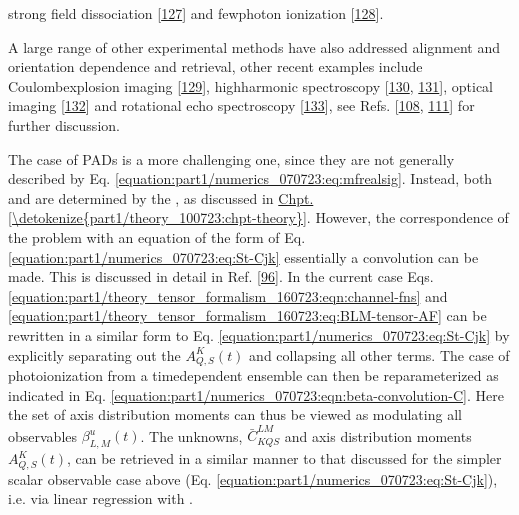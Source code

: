 \documentclass[letterpaper,table,10pt,english]{jupyterBook}
\begin{document}
strong field dissociation {[}\hyperlink{cite.backmatter/bibliography:id996}{127}{]} and few\sphinxhyphen{}photon ionization {[}\hyperlink{cite.backmatter/bibliography:id995}{128}{]}.%
\begin{footnote}[2]\sphinxAtStartFootnote
A large range of other experimental methods have also addressed alignment and orientation dependence and retrieval, other recent examples include Coulomb\sphinxhyphen{}explosion imaging {[}\hyperlink{cite.backmatter/bibliography:id936}{129}{]}, high\sphinxhyphen{}harmonic spectroscopy {[}\hyperlink{cite.backmatter/bibliography:id644}{130}, \hyperlink{cite.backmatter/bibliography:id645}{131}{]}, optical imaging {[}\hyperlink{cite.backmatter/bibliography:id758}{132}{]} and rotational echo spectroscopy {[}\hyperlink{cite.backmatter/bibliography:id950}{133}{]}, see Refs. {[}\hyperlink{cite.backmatter/bibliography:id726}{108}, \hyperlink{cite.backmatter/bibliography:id833}{111}{]} for further discussion.
%
\end{footnote}

\sphinxAtStartPar
The case of PADs is a more challenging one, since they are not generally described by Eq. \eqref{equation:part1/numerics_070723:eq:mfrealsig}. Instead, both {\hyperref[\detokenize{backmatter/glossary:term-AF}]{}} and {\hyperref[\detokenize{backmatter/glossary:term-MF}]{}} are determined by the {\hyperref[\detokenize{backmatter/glossary:term-radial-matrix-elements}]{}}, as discussed in \hyperref[\detokenize{part1/theory_100723:chpt-theory}]{Chpt.\@ \ref{\detokenize{part1/theory_100723:chpt-theory}}}. However, the correspondence of the problem with an equation of the form of Eq. \eqref{equation:part1/numerics_070723:eq:St-Cjk} \sphinxhyphen{} essentially a convolution \sphinxhyphen{} can be made. This is discussed in detail in Ref. {[}\hyperlink{cite.backmatter/bibliography:id934}{96}{]}. In the current case Eqs. \eqref{equation:part1/theory_tensor_formalism_160723:eqn:channel-fns} and \eqref{equation:part1/theory_tensor_formalism_160723:eq:BLM-tensor-AF} can be rewritten in a similar form to Eq. \eqref{equation:part1/numerics_070723:eq:St-Cjk} by explicitly separating out the {\hyperref[\detokenize{backmatter/glossary:term-ADMs}]{}} \(A_{Q,S}^{K}(t)\) and collapsing all other terms. The case of photoionization from a time\sphinxhyphen{}dependent ensemble can then be reparameterized as indicated in Eq. \eqref{equation:part1/numerics_070723:eqn:beta-convolution-C}. Here the set of axis distribution moments can thus be viewed as modulating all observables \(\beta_{L,M}^{u}(t)\). The unknowns, \(\bar{C}_{KQS}^{LM}\) and axis distribution moments \(A_{Q,S}^{K}(t)\), can be retrieved in a similar manner to that discussed for the simpler scalar observable case above (Eq. \eqref{equation:part1/numerics_070723:eq:St-Cjk}), i.e. via linear regression with {\hyperref[\detokenize{backmatter/glossary:term-RWP}]{}}.
\end{document}
